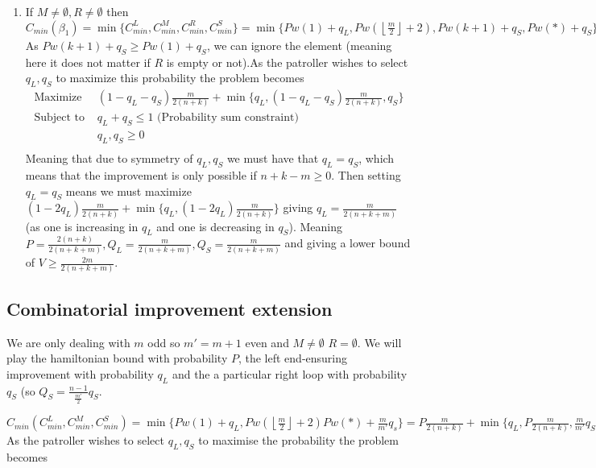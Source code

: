 \documentclass[a4paper,10pt]{article}
\newcommand{\floor}[1]{\left \lfloor #1 \right \rfloor}
\theoremstyle{definition}
\theoremstyle{definition}
\theoremstyle{remark}
\theoremstyle{definition}
\begin{document}
\begin{enumerate}
\item If $M \neq \emptyset , R \neq \emptyset$ then $C_{min} (\beta_{1})=\min \{ C_{min}^{L} , C_{min}^{M} , C_{min}^{R}, C_{min}^{S} \}=\min \{ Pw(1)+q_{L}, Pw(\floor{\frac{m}{2}}+2), Pw(k+1)+q_{S}, Pw(*)+q_{S} \}=\min \{ Pw(1)+q_{L}, Pw(\floor{\frac{m}{2}}+2), Pw(*)+q_{S} \}=P \frac{m}{2(n+k)} + \min \{ q_{L}, P \frac{m}{2(n+k)} , q_{S}  \}$ As $Pw(k+1)+q_{S} \geq Pw(1)+q_{S}$, we can ignore the element (meaning here it does not matter if $R$ is empty or not).As the patroller wishes to select $q_{L},q_{S}$ to maximize this probability the problem becomes
$$\begin{array}{cc}
\text{Maximize} & (1-q_{L}-q_{S}) \frac{m}{2(n+k)} + \min \{ q_{L}, (1-q_{L}-q_{S}) \frac{m}{2(n+k)} , q_{S} \}\\
\text{Subject to } & q_{L}+q_{S} \leq 1 \text{  (Probability sum constraint)} \\
     & q_{L},q_{S} \geq 0 \\
\end{array} $$
Meaning that due to symmetry of $q_{L},q_{S}$ we must have that $q_{L}=q_{S}$, which means that the improvement is only possible if $n+k-m \geq 0$. Then setting $q_{L}=q_{S}$ means we must maximize $(1-2q_{L})\frac{m}{2(n+k)} + \min \{ q_{L} , (1-2q_{L}) \frac{m}{2(n+k)} \}$ giving $q_{L}=\frac{m}{2(n+k+m)}$ (as one is increasing in $q_{L}$ and one is decreasing in $q_{S}$). Meaning $P=\frac{2(n+k)}{2(n+k+m)},Q_{L}=\frac{m}{2(n+k+m)},Q_{S}=\frac{m}{2(n+k+m)}$ and giving a lower bound of $V \geq \frac{2m}{2(n+k+m)}$.
\end{enumerate}

\subsection{Combinatorial improvement extension}
\label{Appendix:Combinatorial improvement extension}
We are only dealing with $m$ odd so $m'=m+1$ even and $M \neq \emptyset$ $R = \emptyset$. We will play the hamiltonian bound with probability $P$, the left end-ensuring improvement with probability $q_{L}$ and the a particular right loop with probability $q_{S}$ (so $Q_{S}=\frac{n-1}{\frac{m'}{2}}q_{S}$.

$C_{min}(C_{min}^{L},C_{min}^M,C_{min}^S)=\min\{Pw(1)+q_{L},Pw(\floor{\frac{m}{2}}+2) Pw(*)+\frac{m}{m'}q_{s}\}=P\frac{m}{2(n+k)}+\min\{q_{L},P\frac{m}{2(n+k)},\frac{m}{m'}q_{S} \}$ As the patroller wishes to select $q_{L},q_{S}$ to maximise the probability the problem becomes
\end{document}
